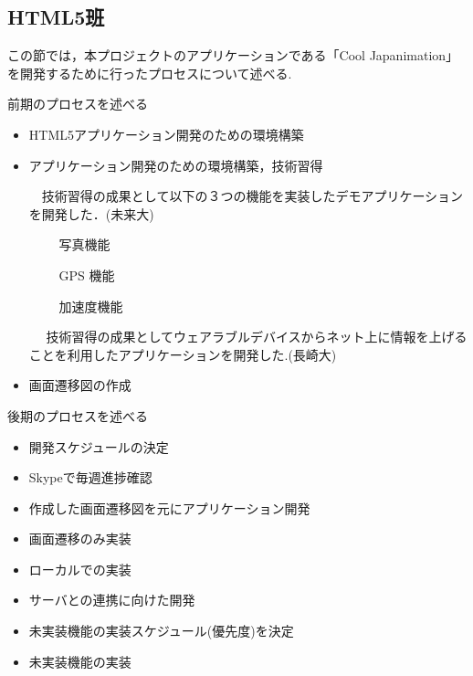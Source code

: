 \subsection{HTML5班}
\par この節では，本プロジェクトのアプリケーションである「Cool Japanimation」を開発するために行ったプロセスについて述べる.

\par 前期のプロセスを述べる
\begin{itemize}
\item HTML5アプリケーション開発のための環境構築
\item アプリケーション開発のための環境構築，技術習得
\par 　技術習得の成果として以下の３つの機能を実装したデモアプリケーションを開発した．(未来大)
\par 　　 写真機能
\par 　　 GPS 機能
\par　  　加速度機能
\par　 技術習得の成果としてウェアラブルデバイスからネット上に情報を上げることを利用したアプリケーションを開発した.(長崎大)
\item 画面遷移図の作成
\end{itemize}

\par 後期のプロセスを述べる
\begin{itemize}
\item 開発スケジュールの決定
\item Skypeで毎週進捗確認
\item 作成した画面遷移図を元にアプリケーション開発
\item 画面遷移のみ実装
\item ローカルでの実装
\item サーバとの連携に向けた開発
\item 未実装機能の実装スケジュール(優先度)を決定
\item 未実装機能の実装
\end{itemize}

